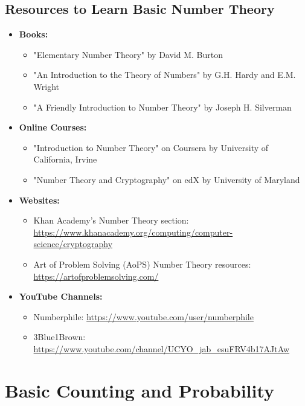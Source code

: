 \documentclass[openany]{book}
\begin{document}
\subsection{Resources to Learn Basic Number Theory}
\begin{itemize}
    \item \textbf{Books:}
    \begin{itemize}
        \item "Elementary Number Theory" by David M. Burton
        \item "An Introduction to the Theory of Numbers" by G.H. Hardy and E.M. Wright
        \item "A Friendly Introduction to Number Theory" by Joseph H. Silverman
    \end{itemize}
    \item \textbf{Online Courses:}
    \begin{itemize}
        \item "Introduction to Number Theory" on Coursera by University of California, Irvine
        \item "Number Theory and Cryptography" on edX by University of Maryland
    \end{itemize}
    \item \textbf{Websites:}
    \begin{itemize}
        \item Khan Academy's Number Theory section: \url{https://www.khanacademy.org/computing/computer-science/cryptography}
        \item Art of Problem Solving (AoPS) Number Theory resources: \url{https://artofproblemsolving.com/}
    \end{itemize}
    \item \textbf{YouTube Channels:}
    \begin{itemize}
        \item Numberphile: \url{https://www.youtube.com/user/numberphile}
        \item 3Blue1Brown: \url{https://www.youtube.com/channel/UCYO_jab_esuFRV4b17AJtAw}
    \end{itemize}
\end{itemize}
\section{Basic Counting and Probability}
\end{document}

